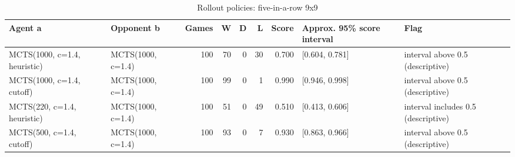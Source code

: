 \begin{table}[!t]
\centering
\caption{Rollout policies: five-in-a-row 9x9}
\label{tab:rollout_gomoku9}
\small
\begin{tabular}{llrrrrrll}
\toprule
Agent a & Opponent b & Games & W & D & L & Score & Approx. 95\% score interval & Flag \\
\midrule
MCTS(1000, c=1.4, heuristic) & MCTS(1000, c=1.4) & 100 & 70 & 0 & 30 & 0.700 & [0.604, 0.781] & interval above 0.5 (descriptive) \\
MCTS(1000, c=1.4, cutoff) & MCTS(1000, c=1.4) & 100 & 99 & 0 & 1 & 0.990 & [0.946, 0.998] & interval above 0.5 (descriptive) \\
MCTS(220, c=1.4, heuristic) & MCTS(1000, c=1.4) & 100 & 51 & 0 & 49 & 0.510 & [0.413, 0.606] & interval includes 0.5 (descriptive) \\
MCTS(500, c=1.4, cutoff) & MCTS(1000, c=1.4) & 100 & 93 & 0 & 7 & 0.930 & [0.863, 0.966] & interval above 0.5 (descriptive) \\
\bottomrule
\end{tabular}
\end{table}
